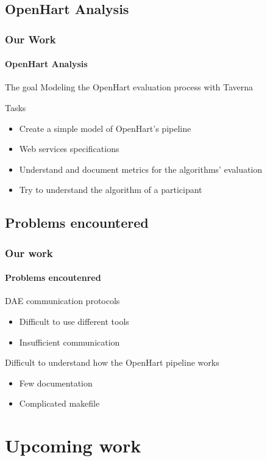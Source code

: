 \documentclass[c]{beamer}
\begin{document}
\subsection{OpenHart Analysis}
\begin{frame}
\frametitle{Our Work}
\framesubtitle{OpenHart Analysis}
\begin{block}{The goal}
Modeling the OpenHart evaluation process with Taverna
\end{block}
\begin{block}{Tasks}
\begin{itemize}
\item Create a simple model of OpenHart's pipeline
\item Web services specifications
\item Understand and document metrics for the algorithms' evaluation
\item Try to understand the algorithm of a participant
\end{itemize}
\end{block}
\end{frame}
\subsection{Problems encountered}
\begin{frame}
\frametitle{Our work}
\framesubtitle{Problems encoutenred}
\begin{block}{DAE communication protocols}
\begin{itemize}
\item Difficult to use different tools
\item Insufficient communication
\end{itemize}
\end{block}
\begin{block}{Difficult to understand how the OpenHart pipeline works}
\begin{itemize}
\item Few documentation
\item Complicated makefile
\end{itemize}
\end{block}
\end{frame}
\section{Upcoming work}
\end{document}
